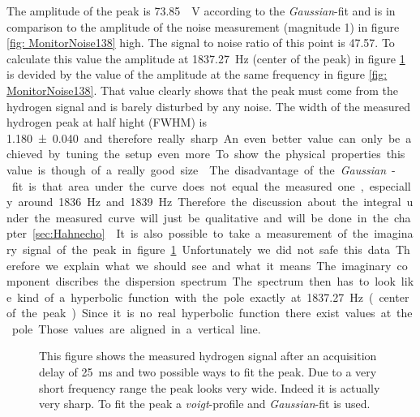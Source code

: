 The amplitude of the peak is \SI{73.85}{\mu \volt} according to the \textit{Gaussian}-fit and is in comparison to the amplitude of the noise measurement (magnitude \SI{1}{}) in figure \ref{fig: MonitorNoise138} high. The signal to noise ratio of this point is \SI{47.57}{}. To calculate this value the amplitude at \SI{1837.27}{\hertz} (center of the peak) in figure \ref{fig:Pulsandcollect138_delay_25_gauss} is devided by the value of the amplitude at the same frequency in figure \ref{fig: MonitorNoise138}. That value clearly shows that the peak must come from the hydrogen signal and is barely disturbed by any noise.\newline
The width of the measured hydrogen peak at half hight (FWHM) is \SI{1.180 \pm 0.040} and therefore really sharp. An even better value can only be achieved by tuning the setup even more. To show the physical properties this value is though of a really good size.\newline
The disadvantage of the \textit{Gaussian}-fit is that area under the curve does not equal the measured one, especially around \SI{1836}{\hertz} and \SI{1839}{\hertz}. Therefore the discussion about the integral under the measured curve will just be qualitative and will be done in the chapter \ref{sec:Hahnecho}.\newline
It is also possible to take a measurement of the imaginary signal of the peak in figure \ref{fig:Pulsandcollect138_delay_25_gauss}. Unfortunately we did not safe this data. Therefore we explain what we should see and what it means. The imaginary component discribes the dispersion spectrum. The spectrum then has to look like kind of a hyperbolic function with the pole exactly at \SI{1837.27}{\hertz} (center of the peak). Since it is no real hyperbolic function there exist values at the pole. Those values are aligned in a vertical line.
\begin{figure}[H]
    \centering
    
    \caption[This figure shows the measured hydrogen signal after an acquisition delay of \SI{25}{\milli \second} and two possible ways to fit the peak.]{This figure shows the measured hydrogen signal after an acquisition delay of \SI{25}{\milli \second} and two possible ways to fit the peak. Due to a very short frequency range the peak looks very wide. Indeed it is actually very sharp. To fit the peak a \textit{voigt}-profile and \textit{Gaussian}-fit is used.}
    \label{fig:Pulsandcollect138_delay_25_gauss}
\end{figure}